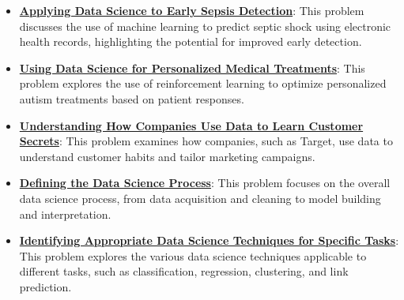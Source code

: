 \documentclass{article}%
\begin{document}
\begin{itemize}[leftmargin=*]
\item \href{https://purdue.brightspace.com/d2l/common/assets/pdfjs-d2l-dist/1.0.14-legacy/web/viewer.html?file=\%2Fcontent\%2Fenforced\%2F1095465-WL.202510.CS24200.LE1\%2F02L1-datas-intro.pdf\%3Fou\%3D1095465\&lang=en-us\&container=d2l-fileviewer-rendered-pdf\&fullscreen=d2l-fileviewer-rendered-pdf-dialog\&height=667#page=19}{\textbf{Applying Data Science to Early Sepsis Detection}}: This problem discusses the use of machine learning to predict septic shock using electronic health records, highlighting the potential for improved early detection.%
\item \href{https://purdue.brightspace.com/d2l/common/assets/pdfjs-d2l-dist/1.0.14-legacy/web/viewer.html?file=\%2Fcontent\%2Fenforced\%2F1095465-WL.202510.CS24200.LE1\%2F02L1-datas-intro.pdf\%3Fou\%3D1095465\&lang=en-us\&container=d2l-fileviewer-rendered-pdf\&fullscreen=d2l-fileviewer-rendered-pdf-dialog\&height=667#page=20}{\textbf{Using Data Science for Personalized Medical Treatments}}: This problem explores the use of reinforcement learning to optimize personalized autism treatments based on patient responses.%
\item \href{https://purdue.brightspace.com/d2l/common/assets/pdfjs-d2l-dist/1.0.14-legacy/web/viewer.html?file=\%2Fcontent\%2Fenforced\%2F1095465-WL.202510.CS24200.LE1\%2F02L1-datas-intro.pdf\%3Fou\%3D1095465\&lang=en-us\&container=d2l-fileviewer-rendered-pdf\&fullscreen=d2l-fileviewer-rendered-pdf-dialog\&height=667#page=21}{\textbf{Understanding How Companies Use Data to Learn Customer Secrets}}: This problem examines how companies, such as Target, use data to understand customer habits and tailor marketing campaigns.%
\item \href{https://purdue.brightspace.com/d2l/common/assets/pdfjs-d2l-dist/1.0.14-legacy/web/viewer.html?file=\%2Fcontent\%2Fenforced\%2F1095465-WL.202510.CS24200.LE1\%2F02L1-datas-intro.pdf\%3Fou\%3D1095465\&lang=en-us\&container=d2l-fileviewer-rendered-pdf\&fullscreen=d2l-fileviewer-rendered-pdf-dialog\&height=667#page=23}{\textbf{Defining the Data Science Process}}: This problem focuses on the overall data science process, from data acquisition and cleaning to model building and interpretation.%
\item \href{https://purdue.brightspace.com/d2l/common/assets/pdfjs-d2l-dist/1.0.14-legacy/web/viewer.html?file=\%2Fcontent\%2Fenforced\%2F1095465-WL.202510.CS24200.LE1\%2F02L1-datas-intro.pdf\%3Fou\%3D1095465\&lang=en-us\&container=d2l-fileviewer-rendered-pdf\&fullscreen=d2l-fileviewer-rendered-pdf-dialog\&height=667#page=27}{\textbf{Identifying Appropriate Data Science Techniques for Specific Tasks}}: This problem explores the various data science techniques applicable to different tasks, such as classification, regression, clustering, and link prediction.%
\end{itemize}%
\end{document}
